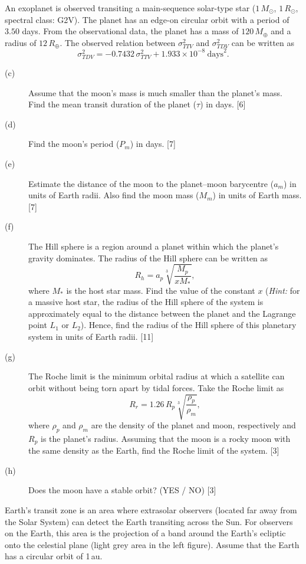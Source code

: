 An exoplanet is observed transiting a main-sequence solar-type star
($1\,M_\odot$, $1\,R_\odot$, spectral class: G2V). The planet has an edge-on
circular orbit with a period of $3.50$ days. From the observational data, the
planet has a mass of $120\,M_\oplus$ and a radius of $12\,R_\oplus$. The
observed relation between $\sigma_{TTV}^2$ and $\sigma_{TDV}^2$ can be written
as
\[ \sigma_{TDV}^2 = -0.7432\,\sigma_{TTV}^2 + 1.933\times10^{-8}\ \mathrm{days}^2. \]

\begin{description}
\item[(c)] Assume that the moon's mass is much smaller than the planet's mass.
  Find the mean transit duration of the planet ($\tau$) in days. \hfill[6]
\item[(d)] Find the moon's period ($P_m$) in days. \hfill[7]
\item[(e)] Estimate the distance of the moon to the planet--moon barycentre
  ($a_m$) in units of Earth radii. Also find the moon mass ($M_m$) in units of
  Earth mass. \hfill[7]
\item[(f)] The Hill sphere is a region around a planet within which the planet's
  gravity dominates. The radius of the Hill sphere can be written as
  \[ R_h = a_p \sqrt[3]{\frac{M_p}{x M_*}}, \]
  where $M_*$ is the host star mass. Find the value of the constant $x$
  (\textit{Hint:} for a massive host star, the radius of the Hill sphere of the
  system is approximately equal to the distance between the planet and the
  Lagrange point $L_1$ or $L_2$). Hence, find the radius of the Hill sphere of
  this planetary system in units of Earth radii. \hfill[11]
\item[(g)] The Roche limit is the minimum orbital radius at which a satellite
  can orbit without being torn apart by tidal forces. Take the Roche limit as
  \[ R_r = 1.26\,R_p \sqrt[3]{\frac{\rho_p}{\rho_m}}, \]
  where $\rho_p$ and $\rho_m$ are the density of the planet and moon,
  respectively and $R_p$ is the planet's radius. Assuming that the moon is a
  rocky moon with the same density as the Earth, find the Roche limit of the
  system. \hfill[3]
\item[(h)] Does the moon have a stable orbit? (YES / NO) \hfill[3]
\end{description}

Earth's transit zone is an area where extrasolar observers (located far away
from the Solar System) can detect the Earth transiting across the Sun. For
observers on the Earth, this area is the projection of a band around the Earth's
ecliptic onto the celestial plane (light grey area in the left figure). Assume
that the Earth has a circular orbit of 1\,au.

